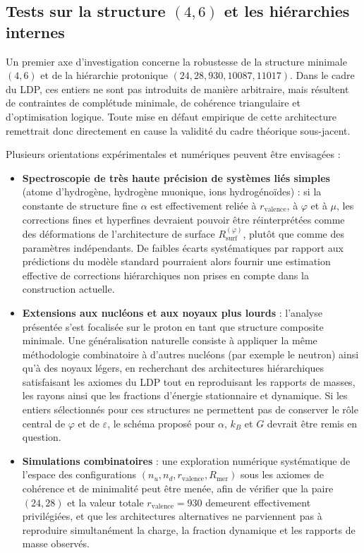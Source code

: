 \documentclass[11pt,a4paper]{article}
\begin{document}
\subsection{Tests sur la structure \texorpdfstring{\(\left(4,6\right)\)}{(4,6)} et les hiérarchies internes}

Un premier axe d’investigation concerne la robustesse de la structure minimale \(\left(4,6\right)\) et de la hiérarchie protonique \(\left(24,28,930,10087,11017\right)\). Dans le cadre du LDP, ces entiers ne sont pas introduits de manière arbitraire, mais résultent de contraintes de complétude minimale, de cohérence triangulaire et d’optimisation logique. Toute mise en défaut empirique de cette architecture remettrait donc directement en cause la validité du cadre théorique sous-jacent.

Plusieurs orientations expérimentales et numériques peuvent être envisagées :
\begin{itemize}
  \item \textbf{Spectroscopie de très haute précision de systèmes liés simples} (atome d’hydrogène, hydrogène muonique, ions hydrogénoïdes) : si la constante de structure fine \(\alpha\) est effectivement reliée à \(r_{\mathrm{valence}}\), à \(\varphi\) et à \(\mu\), les corrections fines et hyperfines devraient pouvoir être réinterprétées comme des déformations de l’architecture de surface \(R_{\mathrm{surf}}^{\left(\varphi\right)}\), plutôt que comme des paramètres indépendants. De faibles écarts systématiques par rapport aux prédictions du modèle standard pourraient alors fournir une estimation effective de corrections hiérarchiques non prises en compte dans la construction actuelle.
  \item \textbf{Extensions aux nucléons et aux noyaux plus lourds} : l’analyse présentée s’est focalisée sur le proton en tant que structure composite minimale. Une généralisation naturelle consiste à appliquer la même méthodologie combinatoire à d’autres nucléons (par exemple le neutron) ainsi qu’à des noyaux légers, en recherchant des architectures hiérarchiques satisfaisant les axiomes du LDP tout en reproduisant les rapports de masses, les rayons ainsi que les fractions d’énergie stationnaire et dynamique. Si les entiers sélectionnés pour ces structures ne permettent pas de conserver le rôle central de \(\varphi\) et de \(\varepsilon\), le schéma proposé pour \(\alpha\), \(k_B\) et \(G\) devrait être remis en question.
  \item \textbf{Simulations combinatoires} : une exploration numérique systématique de l’espace des configurations \(\left(n_u,n_d,r_{\mathrm{valence}},R_{\mathrm{mer}}\right)\) sous les axiomes de cohérence et de minimalité peut être menée, afin de vérifier que la paire \(\left(24,28\right)\) et la valeur totale \(r_{\mathrm{valence}} = 930\) demeurent effectivement privilégiées, et que les architectures alternatives ne parviennent pas à reproduire simultanément la charge, la fraction dynamique et les rapports de masse observés.
\end{itemize}
\end{document}
